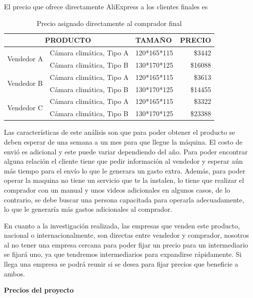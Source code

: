 El precio que ofrece directamente AliExpress \cite{AliExpress} a los clientes finales es

\begin{table}[h!]
\centering
\begin{tabular}{|l|l|l|r|}
\hline
\multicolumn{2}{|c|}{\textbf{PRODUCTO}} & \textbf{TAMAÑO} & \textbf{PRECIO} \\ \hline
\multirow{2}{*}{Vendedor A} & Cámara climática, Tipo A & 120*165*115 & \$3442 \\
                            & Cámara climática, Tipo B & 130*170*125 & \$16088 \\ \hline
\multirow{2}{*}{Vendedor B} & Cámara climática, Tipo A & 120*165*115 & \$3613 \\
                            & Cámara climática, Tipo B & 130*170*125 & \$14455 \\ \hline
\multirow{2}{*}{Vendedor C} & Cámara climática, Tipo A & 120*165*115 & \$3322 \\
                            & Cámara climática, Tipo B & 130*170*125 & \$23388 \\ \hline
\end{tabular}
\caption{Precio asignado directamente al comprador final}
\end{table}


Las características de este análisis son que para poder obtener el producto se deben esperar de una semana a un mes para que llegue la máquina. El costo de envió es adicional y este puede variar dependiendo del año. Para poder encontrar alguna relación el cliente tiene que pedir información al vendedor y esperar aún más tiempo para el envío lo que le generara un gasto extra. Además, para poder operar la maquina no tiene un servicio que te la instalen, lo tiene que realizar el comprador con un manual y unos videos adicionales en algunos casos, de lo contrario, se debe buscar una persona capacitada para operarla adecuadamente, lo que le generaría más gastos adicionales al comprador.

En cuanto a la investigación realizada, las empresas que venden este producto, nacional o internacionalmente, son directas entre vendedor y comprador, nosotros al no tener una empresa cercana para poder fijar un precio para un intermediario se fijará uno, ya que tendremos intermediarios para expandirse rápidamente. Si llega una empresa se podrá reunir si se desea para fijar precios que beneficie a ambos.


\textbf{Precios del proyecto}


